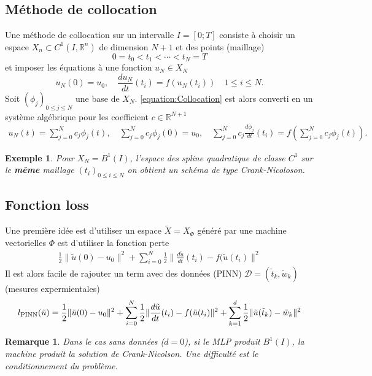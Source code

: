 \documentclass[11pt,a4paper]{article}
\newcommand{\R}{\mathbb R}
\newcommand{\norm}[1]{\|#1\|}
\newtheorem{remark}[theorem]{Remarque}
\newtheorem{example}[theorem]{Exemple}
\begin{document}
\subsection{Méthode de collocation}\label{subsec:}
%
Une méthode de collocation sur un intervalle $I=[0;T]$ consiste à choisir un espace $X_n\subset C^1(I,\R^n)$ de dimension $N+1$ et des points (maillage)
%
\begin{equation}\label{equation:Mesh}
0 = t_0 < t_1 < \cdots < t_N = T
\end{equation}
%
et imposer les équations à une fonction $u_N\in X_N$
%
\begin{equation}\label{equation:Collocation}
u_N(0) = u_0,\quad \frac{du_N}{dt}(t_i) = f(u_N(t_i))\quad 1\le i\le N.
\end{equation}
%
Soit $(\phi_j)_{0\le j\le N}$ une base de $X_N$. \eqref{equation:Collocation} est alors converti en un système algébrique pour les coefficient $c\in\R^{N+1}$
\begin{align*}
u_N(t) = \sum_{j=0}^N c_j \phi_j(t),\quad \sum_{j=0}^N c_j \phi_j(0) = u_0,\quad \sum_{j=0}^N c_j\frac{d\phi_j}{dt}(t_i) = f(\sum_{j=0}^N c_j \phi_j(t)).
\end{align*}
%
%
\begin{example}\label{example:}
Pour $X_N = B^1(I)$, l'espace des spline quadratique de classe $C^1$ sur le \textbf{même} maillage $(t_i)_{0\le i\le N}$ on obtient un schéma de type Crank-Nicoloson.
\end{example}
%
%
\subsection{Fonction loss}\label{subsec:}
%
Une première idée est d'utiliser un espace $\tilde X=X_{\Phi}$ généré par une machine vectorielles $\Phi$ est d'utiliser la fonction perte
\begin{align*}
\frac12\norm{\tilde u(0)-u_0}^2 + \sum_{i=0}^N \frac12\norm{\frac{d\tilde u}{dt}(t_i) - f(\tilde u(t_i)}^2
\end{align*}
Il est alors facile de rajouter un term avec des données (PINN) $\mathcal D=(\tilde t_k, \tilde w_k)$ (mesures expermientales)
\begin{align*}
l_{\rm PINN}(\tilde u) = \frac12\norm{\tilde u(0)-u_0}^2 + \sum_{i=0}^N \frac12\norm{\frac{d\tilde u}{dt}(t_i) - f(\tilde u(t_i)}^2 + \sum_{k=1}^d \frac12\norm{\tilde u(\tilde t_k) - \tilde w_k}^2
\end{align*}
%
%
\begin{remark}\label{remark:}
Dans le cas sans données ($d=0$), si le MLP produit $B^1(I)$, la machine produit la solution de Crank-Nicolson. Une difficulté est 
le conditionnement du problème.
\end{remark}
%
%
\end{document}
